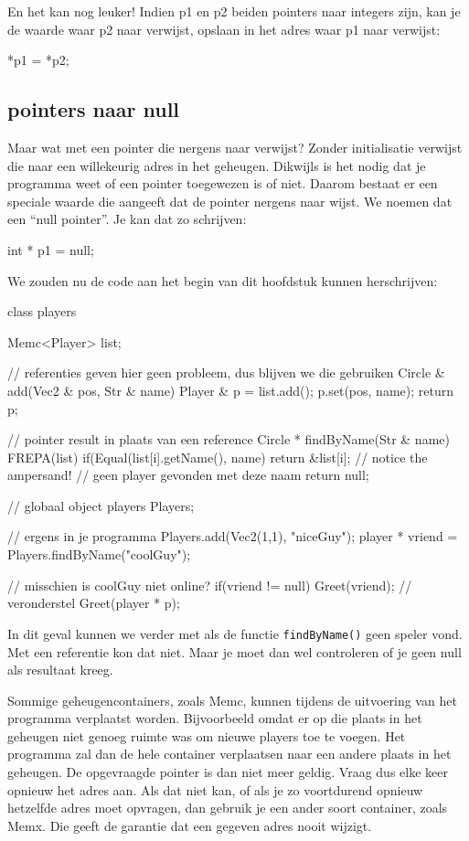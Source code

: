 En het kan nog leuker! Indien p1 en p2 beiden pointers naar integers zijn, kan je de waarde waar p2 naar verwijst, opslaan in het adres waar p1 naar verwijst:

\begin{code}
*p1 = *p2;
\end{code}

\subsection{pointers naar null}
Maar wat met een pointer die nergens naar verwijst? Zonder initialisatie verwijst die naar een willekeurig adres in het geheugen. Dikwijls is het nodig dat je programma weet of een pointer toegewezen is of niet. Daarom bestaat er een speciale waarde die aangeeft dat de pointer nergens naar wijst. We noemen dat een ``null pointer''. Je kan dat zo schrijven:

\begin{code}
int * p1 = null;
\end{code}

We zouden nu de code aan het begin van dit hoofdstuk kunnen herschrijven:

\begin{code}
class players {
  Memc<Player> list;
  
  // referenties geven hier geen probleem, dus blijven we die gebruiken	
  Circle &  add(Vec2 & pos, Str & name) {
    Player & p = list.add();
    p.set(pos, name);
    return p;
  }	  

  // pointer result in plaats van een reference	
  Circle * findByName(Str & name) {
    FREPA(list) {
      if(Equal(list[i].getName(), name) {
        return &list[i]; // notice the ampersand!
      }
    }
    // geen player gevonden met deze naam
    return null;
  }	
}
// globaal object
players Players;

// ergens in je programma 
Players.add(Vec2(1,1), "niceGuy");
player * vriend = Players.findByName("coolGuy");

// misschien is coolGuy niet online?
if(vriend != null) {
  Greet(vriend); // veronderstel Greet(player * p);
}
\end{code} 

In dit geval kunnen we verder met als de functie \texttt{findByName()} geen speler vond. Met een referentie kon dat niet. Maar je moet dan wel controleren of je geen null als resultaat kreeg.

\begin{note}
Sommige geheugencontainers, zoals Memc, kunnen tijdens de uitvoering van het programma verplaatst worden. Bijvoorbeeld omdat er op die plaats in het geheugen niet genoeg ruimte was om nieuwe players toe te voegen. Het programma zal dan de hele container verplaatsen naar een andere plaats in het geheugen. De opgevraagde pointer is dan niet meer geldig. Vraag dus elke keer opnieuw het adres aan. Als dat niet kan, of als je zo voortdurend opnieuw hetzelfde adres moet opvragen, dan gebruik je een ander soort container, zoals Memx. Die geeft de garantie dat een gegeven adres nooit wijzigt.
\end{note} 

